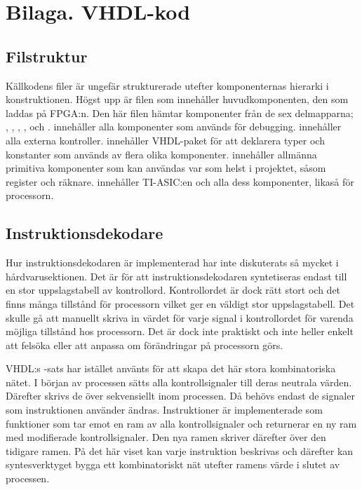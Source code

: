\documentclass[main.tex]{subfiles}
\begin{document}
\section{Bilaga. VHDL-kod}

\subsection{Filstruktur}
Källkodens filer är ungefär strukturerade utefter komponenternas hierarki i
konstruktionen. Högst upp är filen  som innehåller
huvudkomponenten, den som laddas på FPGA:n. Den här filen hämtar komponenter
från de sex delmapparna; , , , ,
 och .  innehåller alla komponenter som används
för debugging.  innehåller alla externa kontroller. 
innehåller VHDL-paket för att deklarera typer och konstanter som används av
flera olika komponenter.  innehåller allmänna primitiva komponenter
som kan användas var som helst i projektet, såsom register och räknare.
 innehåller TI-ASIC:en och alla dess komponenter,  likaså
för processorn.

\subsection{Instruktionsdekodare}
Hur instruktionsdekodaren är implementerad har inte diskuterats så mycket i
hårdvaru\-sektionen. Det är för att instruktionsdekodaren syntetiseras endast
till en stor uppslagstabell av kontrollord. Kontrollordet är dock rätt stort
och det finns många tillstånd för processorn vilket ger en väldigt stor
uppslagstabell. Det skulle gå att manuellt skriva in värdet för varje signal i
kontrollordet för varenda möjliga tillstånd hos processorn. Det är dock inte
praktiskt och inte heller enkelt att felsöka eller att anpassa om förändringar
på processorn görs.

VHDL:s -sats har istället använts för att skapa det här stora
kombinatoriska nätet. I början av processen sätts alla kontrollsignaler till
deras neutrala värden. Därefter skrivs de över sekvensiellt inom processen. Då
behövs endast de signaler som instruktionen använder ändras. Instruktioner är
implementerade som funktioner som tar emot en ram av alla kontrollsignaler och
returnerar en ny ram med modifierade kontrollsignaler. Den nya ramen skriver
därefter över den tidigare ramen. På det här viset kan varje instruktion
beskrivas och därefter kan syntesverktyget bygga ett kombinatoriskt nät utefter
ramens värde i slutet av processen.
\end{document}
